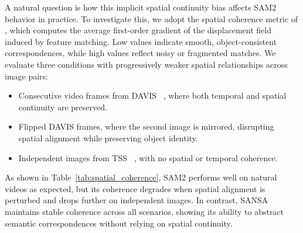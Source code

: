 A natural question is how this implicit spatial continuity bias affects SAM2 behavior in practice. To investigate this, we adopt the spatial coherence metric of \cite{zhang2023tale}, which computes the average first-order gradient of the displacement field induced by feature matching. Low values indicate smooth, object-consistent correspondences, while high values reflect noisy or fragmented matches. We evaluate three conditions with progressively weaker spatial relationships across image pairs:
\begin{itemize}[noitemsep]
    \item[(i)] Consecutive video frames from DAVIS ~\cite{perazzi2016benchmark}, where both temporal and spatial continuity are preserved.
    \item[(ii)] Flipped DAVIS frames, where the second image is mirrored, disrupting spatial alignment while preserving object identity.
    \item[(iii)] Independent images from TSS ~\cite{taniai2016joint}, with no spatial or temporal coherence.
\end{itemize}


As shown in Table~\ref{tab:spatial_coherence}, SAM2 performs well on natural videos as expected, but its coherence degrades when spatial alignment is perturbed and drops further on independent images. In contrast, SANSA maintains stable coherence across all scenarios, showing its ability to abstract semantic correspondences without relying on spatial continuity.

\begin{table}[h]
\centering
\caption{\textbf{Spatial coherence across varying continuity conditions.} Lower is better.}
\vspace{0.5em}
\label{tab:spatial_coherence}
\end{table}


